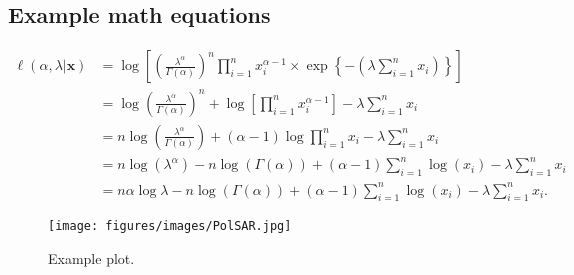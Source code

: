 \subsection*{Example math equations}
\begin{align}
\label{eq:em}
\ell(\alpha, \lambda| \bm{x}) &=\log\left[\left(\frac{\lambda^{\alpha}}{\Gamma(\alpha)}\right)^n\prod_{i=1}^nx_i^{\alpha-1}\times \exp\left\{-\left(\lambda\sum_{i=1}^n x_i \right)\right\}\right]\nonumber\\
&=\log\left(\frac{\lambda^{\alpha}}{\Gamma(\alpha)}\right)^n+\log\left[\prod_{i=1}^nx_i^{\alpha-1}\right]-\lambda\sum_{i=1}^nx_i\nonumber\\
&=n\log\left(\frac{\lambda^{\alpha}}{\Gamma(\alpha)}\right)+(\alpha-1)\log\prod_{i=1}^nx_i-\lambda\sum_{i=1}^nx_i\nonumber\\
&=n\log(\lambda^{\alpha})-n\log(\Gamma(\alpha))+(\alpha-1)\sum_{i=1}^n\log(x_i)-\lambda\sum_{i=1}^nx_i\nonumber\\
&=n\alpha\log \lambda -n\log(\Gamma(\alpha)) +(\alpha-1)\sum_{i=1}^n\log(x_i)-\lambda\sum_{i=1}^nx_i.
	\end{align}
\begin{figure}
    \centering
    \texttt{[image: figures/images/PolSAR.jpg]}
    \decoRule
    \caption[Example plot]{Example plot.}
    \label{fig:undercatch}
\end{figure}


